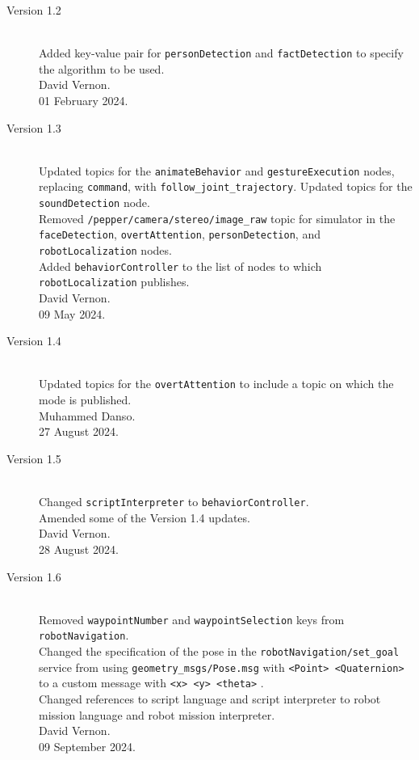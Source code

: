 \documentclass{CSSRforAfrica}
\begin{document}
{{\begin{description}
\item [Version 1.2]~\\
Added key-value pair for {\small \verb+personDetection+} and {\small \verb+factDetection+} to specify the algorithm to be used.\\
David Vernon. \\                          
01  February 2024.

\item [Version 1.3]~\\
Updated topics for the  {\small \verb+animateBehavior+} and  {\small \verb+gestureExecution+}  nodes, replacing {\small \verb+command+}, with {\small \verb+follow_joint_trajectory+}. Updated topics for the {\small \verb+soundDetection+} node.\\
Removed  {\small \verb+/pepper/camera/stereo/image_raw+} topic for simulator in the  {\small \verb+faceDetection+},  {\small \verb+overtAttention+},  {\small \verb+personDetection+}, and  {\small \verb+robotLocalization+}    nodes.\\
Added {\footnotesize \verb+behaviorController+} to the list of nodes to which {\footnotesize \verb+robotLocalization+} publishes.\\
David Vernon. \\                          
09  May 2024.

\item [Version 1.4]~\\
Updated topics for the  {\small \verb+overtAttention+}  to include a topic on which the mode is published.\\
Muhammed Danso. \\                          
27 August 2024.


\item [Version 1.5]~\\
Changed  {\small \verb+scriptInterpreter+}  to {\small \verb+behaviorController+}.\\
Amended some of the Version 1.4 updates.\\
David Vernon. \\                          
28 August 2024.

\item [Version 1.6]~\\
Removed   {\small \verb+waypointNumber+}  and {\small \verb+waypointSelection+} keys  from  {\small \verb+robotNavigation+}. \\
Changed the specification of the pose in the {\small \verb+robotNavigation/set_goal+} service from using {\small \verb+geometry_msgs/Pose.msg+} with {\small \verb+<Point> <Quaternion>+}  to a custom message with  {\small \verb+<x> <y> <theta>+} .\\
Changed references to script language and script interpreter to robot mission language and robot mission interpreter.\\
David Vernon. \\                          
09 September 2024.


\end{description}}}
\end{document}
